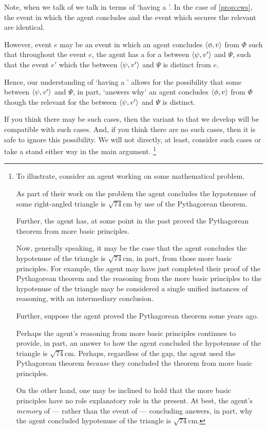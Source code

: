 \begin{note}
  Note, when we talk of  we talk in terms of `having a '.
  In the case of \autoref{prop:cws}, the event in which the agent concludes and the event which secures the relevant \wit{} are identical.

  However, event \(e\) may be an event in which an agent concludes \(\langle \phi, v \rangle\) from \(\Phi\) such that throughout the event \(e\), the agent has a \wit{} for a \ros{} between \(\langle \psi, v' \rangle\) and \(\Psi\), such that the event \(e'\) which  the \ros{} between \(\langle \psi, v' \rangle\) and \(\Psi\) is distinct from \(e\).

  Hence, our understanding of `having a ' allows for the possibility that some \ros{} between \(\langle \psi, v' \rangle\) and \(\Psi\), in part, `answers why' an agent concludes \(\langle \phi, v \rangle\) from \(\Phi\) though the relevant  for the \ros{} between \(\langle \psi, v' \rangle\) and \(\Psi\) is distinct.

  If you think there may be such cases, then the variant to \issueInclusion{} that we develop will be compatible with such cases.
  And, if you think there are no such cases, then it is safe to ignore this possibility.
  We will not directly, at least, consider such cases or take a stand either way in the main argument.%
  \footnote{
    To illustrate, consider an agent working on some mathematical problem.

    As part of their work on the problem the agent concludes the hypotenuse of some right-angled triangle is \(\sqrt{74}\text{cm}\) by use of the Pythagorean theorem.

    Further, the agent has, at some point in the past proved the Pythagorean theorem from more basic principles.

    Now, generally speaking, it may be the case that the agent concludes the hypotenuse of the triangle is \(\sqrt{74}\text{cm}\), in part, from those more basic principles.
    For example, the agent may have just completed their proof of the Pythagorean theorem and the reasoning from the more basic principles to the hypotenuse of the triangle may be considered a single unified instances of reasoning, with an intermediary conclusion.

    Further, suppose the agent proved the Pythagorean theorem some years ago.

    Perhaps the agent's reasoning from more basic principles continues to provide, in part, an answer to how the agent concluded the hypotenuse of the triangle is \(\sqrt{74}\text{cm}\).
    Perhaps, regardless of the gap, the agent used the Pythagorean theorem \emph{because} they concluded the theorem from more basic principles.

    On the other hand, one may be inclined to hold that the more basic principles have no role explanatory role in the present.
    At best, the agent's \emph{memory} of --- rather than the event of --- concluding answers, in part, why the agent concluded hypotenuse of the triangle is \(\sqrt{74}\text{cm}\).
  }
\end{note}

